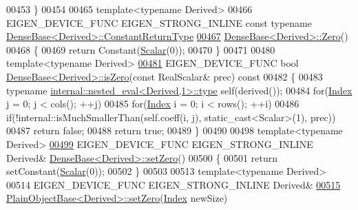 \begin{DoxyCode}
00453 \}
00454 
00465 \textcolor{keyword}{template}<\textcolor{keyword}{typename} Derived>
00466 EIGEN\_DEVICE\_FUNC EIGEN\_STRONG\_INLINE \textcolor{keyword}{const} \textcolor{keyword}{typename} 
      \hyperlink{group___core___module_class_eigen_1_1_cwise_nullary_op}{DenseBase<Derived>::ConstantReturnType}
\hyperlink{group___core___module_a8c4be762b10041d64a2b2ce85bb14ba0}{00467} \hyperlink{group___core___module_a8c4be762b10041d64a2b2ce85bb14ba0}{DenseBase<Derived>::Zero}()
00468 \{
00469   \textcolor{keywordflow}{return} Constant(\hyperlink{group___core___module_a5feed465b3a8e60c47e73ecce83e39a2}{Scalar}(0));
00470 \}
00471 
00480 \textcolor{keyword}{template}<\textcolor{keyword}{typename} Derived>
\hyperlink{group___core___module_aad9b1b1368b249e0e0f14b7f2960fb58}{00481} EIGEN\_DEVICE\_FUNC \textcolor{keywordtype}{bool} \hyperlink{group___core___module_aad9b1b1368b249e0e0f14b7f2960fb58}{DenseBase<Derived>::isZero}(\textcolor{keyword}{const} RealScalar& prec)\textcolor{keyword}{ const}
00482 \textcolor{keyword}{}\{
00483   \textcolor{keyword}{typename} \hyperlink{class_eigen_1_1internal_1_1_tensor_lazy_evaluator_writable}{internal::nested\_eval<Derived,1>::type} \textcolor{keyword}{self}(derived());
00484   \textcolor{keywordflow}{for}(\hyperlink{namespace_eigen_a62e77e0933482dafde8fe197d9a2cfde}{Index} j = 0; j < cols(); ++j)
00485     \textcolor{keywordflow}{for}(\hyperlink{namespace_eigen_a62e77e0933482dafde8fe197d9a2cfde}{Index} i = 0; i < rows(); ++i)
00486       \textcolor{keywordflow}{if}(!internal::isMuchSmallerThan(\textcolor{keyword}{self}.coeff(i, j), static\_cast<Scalar>(1), prec))
00487         \textcolor{keywordflow}{return} \textcolor{keyword}{false};
00488   \textcolor{keywordflow}{return} \textcolor{keyword}{true};
00489 \}
00490 
00498 \textcolor{keyword}{template}<\textcolor{keyword}{typename} Derived>
\hyperlink{group___core___module_ac74411ddeea2545bf20baf14613be47e}{00499} EIGEN\_DEVICE\_FUNC EIGEN\_STRONG\_INLINE Derived& \hyperlink{group___core___module_ac74411ddeea2545bf20baf14613be47e}{DenseBase<Derived>::setZero}()
00500 \{
00501   \textcolor{keywordflow}{return} setConstant(\hyperlink{group___core___module_a5feed465b3a8e60c47e73ecce83e39a2}{Scalar}(0));
00502 \}
00503 
00513 \textcolor{keyword}{template}<\textcolor{keyword}{typename} Derived>
00514 EIGEN\_DEVICE\_FUNC EIGEN\_STRONG\_INLINE Derived&
\hyperlink{class_eigen_1_1_plain_object_base_ac21ad5f989f320e46958b75ac8d9a1da}{00515} \hyperlink{class_eigen_1_1_plain_object_base_ac21ad5f989f320e46958b75ac8d9a1da}{PlainObjectBase<Derived>::setZero}(\hyperlink{namespace_eigen_a62e77e0933482dafde8fe197d9a2cfde}{Index} newSize)

\end{DoxyCode}
